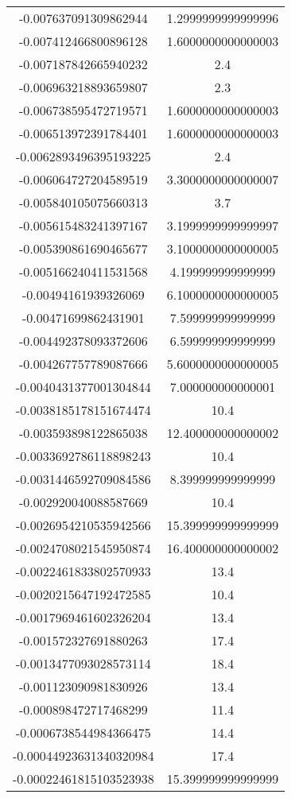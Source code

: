 \begin{table}
\begin{tabular}{S[]S[]}
-0.007637091309862944 & 1.2999999999999996\\
-0.007412466800896128 & 1.6000000000000003\\
-0.007187842665940232 & 2.4\\
-0.006963218893659807 & 2.3\\
-0.006738595472719571 & 1.6000000000000003\\
-0.006513972391784401 & 1.6000000000000003\\
-0.0062893496395193225 & 2.4\\
-0.006064727204589519 & 3.3000000000000007\\
-0.005840105075660313 & 3.7\\
-0.005615483241397167 & 3.1999999999999997\\
-0.005390861690465677 & 3.1000000000000005\\
-0.005166240411531568 & 4.199999999999999\\
-0.00494161939326069 & 6.1000000000000005\\
-0.00471699862431901 & 7.599999999999999\\
-0.004492378093372606 & 6.599999999999999\\
-0.004267757789087666 & 5.6000000000000005\\
-0.0040431377001304844 & 7.000000000000001\\
-0.0038185178151674474 & 10.4\\
-0.003593898122865038 & 12.400000000000002\\
-0.0033692786118898243 & 10.4\\
-0.0031446592709084586 & 8.399999999999999\\
-0.002920040088587669 & 10.4\\
-0.0026954210535942566 & 15.399999999999999\\
-0.0024708021545950874 & 16.400000000000002\\
-0.0022461833802570933 & 13.4\\
-0.0020215647192472585 & 10.4\\
-0.0017969461602326204 & 13.4\\
-0.001572327691880263 & 17.4\\
-0.0013477093028573114 & 18.4\\
-0.001123090981830926 & 13.4\\
-0.000898472717468299 & 11.4\\
-0.0006738544984366475 & 14.4\\
-0.00044923631340320984 & 17.4\\
-0.00022461815103523938 & 15.399999999999999\\

\end{tabular}
\end{table}
